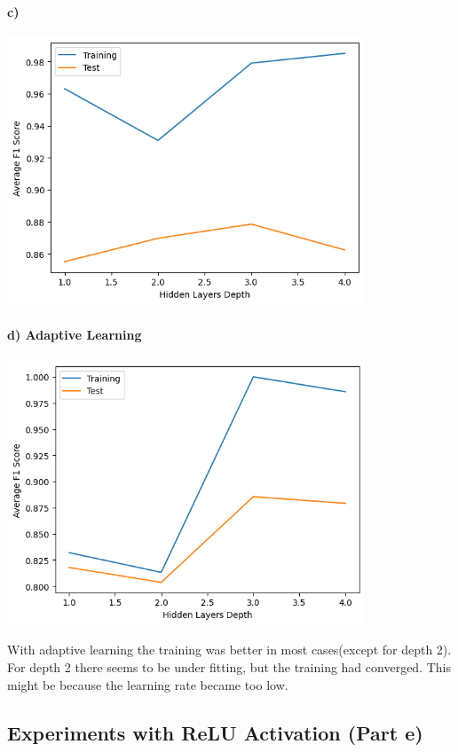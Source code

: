 \documentclass[12pt]{article}
\begin{document}
\paragraph{c) }
\begin{center}
    \includegraphics[width=0.8\textwidth]{Assignment 3/q2/(c) f1 vs hidden_depth.png}
\end{center}

\paragraph{d) Adaptive Learning}
\begin{center}
    \includegraphics[width=0.8\textwidth]{Assignment 3/q2/(d).png}
\end{center}

With adaptive learning the training was better in most cases(except for depth 2). For depth 2 there seems to be under fitting, but the training had converged. This might be because the learning rate became too low.

\subsection{Experiments with ReLU Activation (Part e)}
\end{document}
